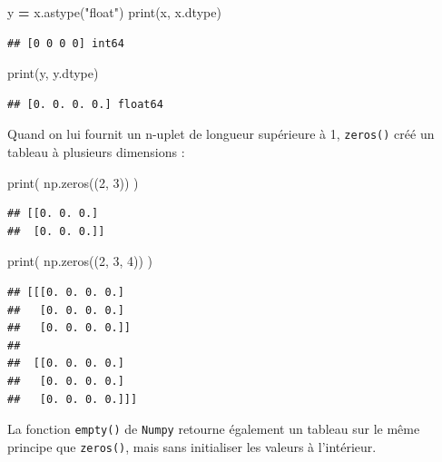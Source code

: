 \documentclass[12pt,]{book}
\newenvironment{Shaded}{\begin{snugshade}}{\end{snugshade}}
\newcommand{\DecValTok}[1]{\textcolor[rgb]{0.00,0.00,0.81}{#1}}
\newcommand{\StringTok}[1]{\textcolor[rgb]{0.31,0.60,0.02}{#1}}
\newcommand{\OperatorTok}[1]{\textcolor[rgb]{0.81,0.36,0.00}{\textbf{#1}}}
\newcommand{\BuiltInTok}[1]{#1}
\newcommand{\NormalTok}[1]{#1}
\numberwithin{equation}{section}
\numberwithin{countremarque}{section}
\begin{document}
\begin{Shaded}
\begin{Highlighting}[]
\NormalTok{y }\OperatorTok{=}\NormalTok{ x.astype(}\StringTok{"float"}\NormalTok{)}
\BuiltInTok{print}\NormalTok{(x, x.dtype)}
\end{Highlighting}
\end{Shaded}

\begin{lstlisting}
## [0 0 0 0] int64
\end{lstlisting}

\begin{Shaded}
\begin{Highlighting}[]
\BuiltInTok{print}\NormalTok{(y, y.dtype)}
\end{Highlighting}
\end{Shaded}

\begin{lstlisting}
## [0. 0. 0. 0.] float64
\end{lstlisting}

Quand on lui fournit un n-uplet de longueur supérieure à 1,
\texttt{zeros()} créé un tableau à plusieurs dimensions :

\begin{Shaded}
\begin{Highlighting}[]
\BuiltInTok{print}\NormalTok{( np.zeros((}\DecValTok{2}\NormalTok{, }\DecValTok{3}\NormalTok{)) )}
\end{Highlighting}
\end{Shaded}

\begin{lstlisting}
## [[0. 0. 0.]
##  [0. 0. 0.]]
\end{lstlisting}

\begin{Shaded}
\begin{Highlighting}[]
\BuiltInTok{print}\NormalTok{( np.zeros((}\DecValTok{2}\NormalTok{, }\DecValTok{3}\NormalTok{, }\DecValTok{4}\NormalTok{)) )}
\end{Highlighting}
\end{Shaded}

\begin{lstlisting}
## [[[0. 0. 0. 0.]
##   [0. 0. 0. 0.]
##   [0. 0. 0. 0.]]
## 
##  [[0. 0. 0. 0.]
##   [0. 0. 0. 0.]
##   [0. 0. 0. 0.]]]
\end{lstlisting}

La fonction \texttt{empty()} de \texttt{Numpy} retourne également un
tableau sur le même principe que \texttt{zeros()}, mais sans initialiser
les valeurs à l'intérieur.
\end{document}
